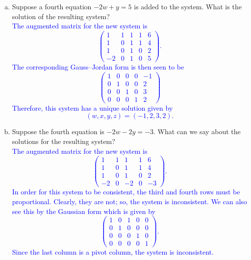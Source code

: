 \documentclass[a4paper,11pt]{article}
\newcommand{\BB}[1]{\textcolor{blue}{#1}}
\begin{document}
\begin{enumerate}[(a)]
\item Suppose a fourth equation $-2w+y=5$ is added to the system. What is the
  solution of the resulting system? \\

  \BB{
    The augmented matrix for the new system is
    \[
      \left(
        \begin{array}{rrrr|r}
          1 & 1 & 1 & 1 & 6 \\
          1 & 0 & 1 & 1 & 4 \\
          1 & 0 & 1 & 0 & 2 \\
          -2 & 0 & 1 & 0 & 5
        \end{array}
      \right).
    \]
    The corresponding Gauss--Jordan form is then seen to be
    \[
      \left(
        \begin{array}{rrrr|r}
          1 & 0 & 0 & 0 & -1 \\
          0 & 1 & 0 & 0 & 2 \\
          0 & 0 & 1 & 0 & 3 \\
          0 & 0 & 0 & 1 & 2
        \end{array}
      \right)
    \]
    Therefore, this system has a unique solution given by
    \[
      (w,x,y,z) = (-1,2,3,2).
    \]
  }
  
\item Suppose the fourth equation is $-2w-2y=-3$. What can we say about the
  solutions for the resulting system? \\

  \BB{
    The augmented matrix for the new system is
    \[
      \left(
        \begin{array}{rrrr|r}
          1 & 1 & 1 & 1 & 6 \\
          1 & 0 & 1 & 1 & 4 \\
          1 & 0 & 1 & 0 & 2 \\
          -2 & 0 & -2 & 0 &-3 
        \end{array}
      \right).
    \]
    In order for this system to be consistent, the third and fourth rows must be
    proportional. Clearly, they are not; so, the system is inconsistent. We can
    also see this by the Gaussian form which is given by
    \[
      \left(
        \begin{array}{rrrr|r}
          1 & 0 & 1 & 0 & 0 \\
          0 & 1 & 0 & 0 & 0 \\
          0 & 0 & 0 & 1 & 0 \\
          0 & 0 & 0 & 0 & 1
        \end{array}
      \right).
    \]
    Since the last column is a pivot column, the system is inconsistent. \\
  }
\end{enumerate}
\end{document}
